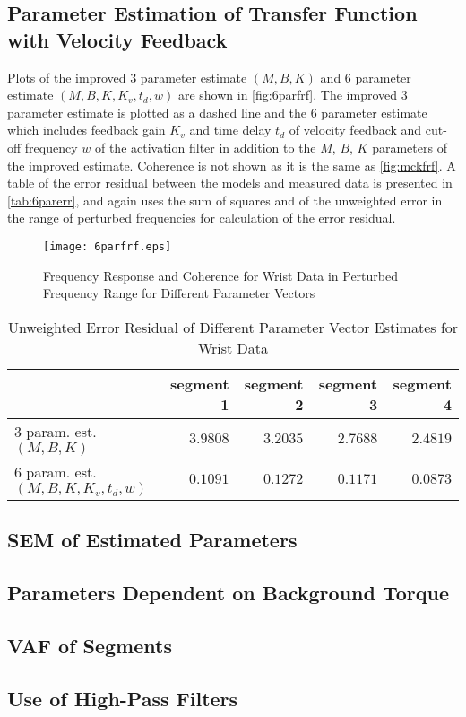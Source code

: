 \documentclass[11pt,a4paper]{article}
\begin{document}
\subsection{Parameter Estimation of Transfer Function with Velocity Feedback}
Plots of the improved 3 parameter estimate $(M, B, K)$ and 6 parameter estimate
$(M, B, K, K_v, t_d, w)$ are shown in \autoref{fig:6parfrf}. The improved 3
parameter estimate is plotted as a dashed line and the 6 parameter estimate
which includes feedback gain $K_v$ and time delay $t_d$ of velocity feedback
and cut-off frequency $w$ of the activation filter in addition to the $M$, $B$,
$K$ parameters of the improved estimate.  Coherence is not shown as it is the
same as \autoref{fig:mckfrf}. A table of the error residual between the models
and measured data is presented in \autoref{tab:6parerr}, and again uses the sum
of squares and of the unweighted error in the range of perturbed frequencies
for calculation of the error residual.

\begin{figure}
    \centering
    \texttt{[image: 6parfrf.eps]}
    \caption{Frequency Response and Coherence for Wrist Data in Perturbed
        Frequency Range for Different Parameter Vectors}
    \label{fig:6parfrf}
\end{figure}

\begin{table}[hb]
    \centering
    \begin{tabular}{|l|r|r|r|r|}
        \hline
        \nonumber & segment 1 & segment 2 & segment 3 & segment 4 \\
        \hline
        3 param. est. $(M, B, K)$ &
            $3.9808$ & $3.2035$ & $2.7688$ & $2.4819$ \\
        6 param. est. $(M, B, K, K_v, t_d, w)$ &
            $0.1091$ & $0.1272$ & $0.1171$ & $0.0873$ \\
        \hline
    \end{tabular}
    \caption{Unweighted Error Residual of Different Parameter Vector Estimates
        for Wrist Data}
    \label{tab:6parerr}
\end{table}

\subsection{SEM of Estimated Parameters}

\subsection{Parameters Dependent on Background Torque}

\subsection{VAF of Segments}

\subsection{Use of High-Pass Filters}
\end{document}
